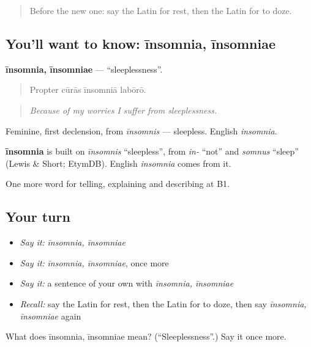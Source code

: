 \begin{quote}
Before the new one: say the Latin for rest, then the Latin for to doze.
\end{quote}

\subsection*{You'll want to know: īnsomnia, īnsomniae}
\textbf{īnsomnia, īnsomniae} — \textquotedblleft{}sleeplessness\textquotedblright{}.

\begin{quote}
Propter cūrās īnsomniā labōrō.
\end{quote}

\begin{quote}
\emph{Because of my worries I suffer from sleeplessness.}
\end{quote}

Feminine, first declension, from \emph{īnsomnis} — sleepless. English \emph{insomnia}.

\begin{cousinweb}
\textbf{īnsomnia} is built on \emph{īnsomnis} \textquotedblleft{}sleepless\textquotedblright{}, from \emph{in-} \textquotedblleft{}not\textquotedblright{} and \emph{somnus} \textquotedblleft{}sleep\textquotedblright{} (Lewis \& Short; EtymDB). English \emph{insomnia} comes from it.
\end{cousinweb}

\begin{grammarlens}[title={What you've built}]
One more word for telling, explaining and describing at B1.
\end{grammarlens}

\subsection*{Your turn}
\begin{itemize}
\raggedright
  \item \emph{Say it:} \emph{īnsomnia, īnsomniae}
  \item \emph{Say it:} \emph{īnsomnia, īnsomniae}, once more
  \item \emph{Say it:} a sentence of your own with \emph{īnsomnia, īnsomniae}
  \item \emph{Recall:} say the Latin for rest, then the Latin for to doze, then say \emph{īnsomnia, īnsomniae} again
\end{itemize}

\begin{tcolorbox}[breakable,colback=teal!4,colframe=teal!35!black,title={Before you move on}]
What does īnsomnia, īnsomniae mean? (\textquotedblleft{}Sleeplessness\textquotedblright{}.) Say it once more.
\end{tcolorbox}
